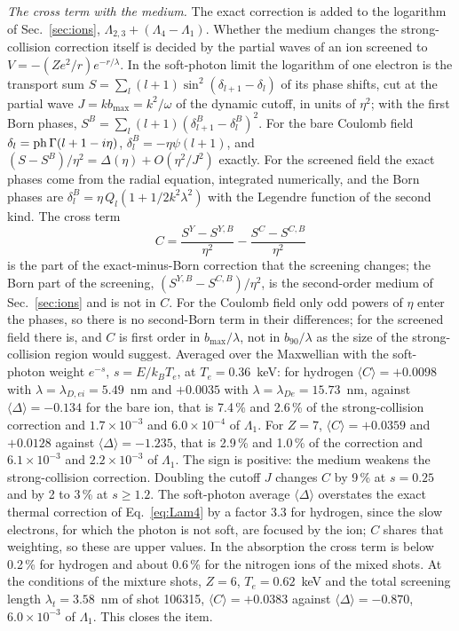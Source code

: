 \documentclass[11pt]{article}
\numberwithin{equation}{section}
\newcommand{\kB}{k_B}
\begin{document}
{\noindent}\emph{The cross term with the medium.} The exact correction is added to the
logarithm of Sec.~\ref{sec:ions}, $\Lambda_{2,3}+(\Lambda_4-\Lambda_1)$. Whether the medium changes the
strong-collision correction itself is decided by the partial waves of an ion screened to
$V=-(Ze^2/r)e^{-r/\lambda}$. In the soft-photon limit the logarithm of one electron is the
transport sum $S=\sum_l(l+1)\sin^2(\delta_{l+1}-\delta_l)$ of its phase shifts, cut at the
partial wave $J=kb_{\max}=k^2/\omega$ of the dynamic cutoff, in units of $\eta^2$; with
the first Born phases, $S^B=\sum_l(l+1)(\delta^B_{l+1}-\delta^B_l)^2$. For the bare Coulomb
field $\delta_l={\rm ph}\,\Gamma(l+1-i\eta)$, $\delta^B_l=-\eta\psi(l+1)$, and
$(S-S^B)/\eta^2=\Delta(\eta)+O(\eta^2/J^2)$ exactly. For the screened field the exact
phases come from the radial equation, integrated numerically, and the Born phases are
$\delta^B_l=\eta\,Q_l(1+1/2k^2\lambda^2)$ with the Legendre function of the second kind.
The cross term
\begin{equation}
C=\frac{S^Y-S^{Y,B}}{\eta^2}-\frac{S^C-S^{C,B}}{\eta^2}
\label{eq:cross}
\end{equation}
is the part of the exact-minus-Born correction that the screening changes; the Born part
of the screening, $(S^{Y,B}-S^{C,B})/\eta^2$, is the second-order medium of Sec.~\ref{sec:ions} and is not
in $C$. For the Coulomb field only odd powers of $\eta$ enter the phases, so there is no
second-Born term in their differences; for the screened field there is, and $C$ is
first order in $b_{\max}/\lambda$, not in $b_{90}/\lambda$ as the size of the strong-collision region
would suggest.
Averaged over the Maxwellian with the soft-photon weight $e^{-s}$, $s=E/\kB T_e$, at
$T_e=0.36$~keV: for hydrogen $\langle C\rangle=+0.0098$ with $\lambda=\lambda_{D,ei}=5.49$~nm
and $+0.0035$ with $\lambda=\lambda_{De}=15.73$~nm, against $\langle\Delta\rangle=-0.134$ for the
bare ion, that is 7.4\,\% and 2.6\,\% of the strong-collision correction and
$1.7\times10^{-3}$ and $6.0\times10^{-4}$ of $\Lambda_1$. For $Z=7$,
$\langle C\rangle=+0.0359$ and $+0.0128$ against $\langle\Delta\rangle=-1.235$, that is 2.9\,\%
and 1.0\,\% of the correction and $6.1\times10^{-3}$ and $2.2\times10^{-3}$ of $\Lambda_1$.
The sign is positive: the medium weakens the strong-collision correction. Doubling the
cutoff $J$ changes $C$ by 9\,\% at $s=0.25$ and by 2 to 3\,\% at $s\ge1.2$. The soft-photon
average $\langle\Delta\rangle$ overstates the exact thermal correction of Eq.~\eqref{eq:Lam4} by a factor
3.3 for hydrogen, since the slow electrons, for which the photon is not soft, are
focused by the ion; $C$ shares that weighting, so these are upper values. In the
absorption the cross term is below 0.2\,\% for hydrogen and about 0.6\,\% for the
nitrogen ions of the mixed shots. At the conditions of the mixture shots, $Z=6$, $T_e=0.62$~keV and the total screening length
$\lambda_t=3.58$~nm of shot 106315, $\langle C\rangle=+0.0383$ against $\langle\Delta\rangle=-0.870$,
$6.0\times10^{-3}$ of $\Lambda_1$. This closes the item.
\end{document}
